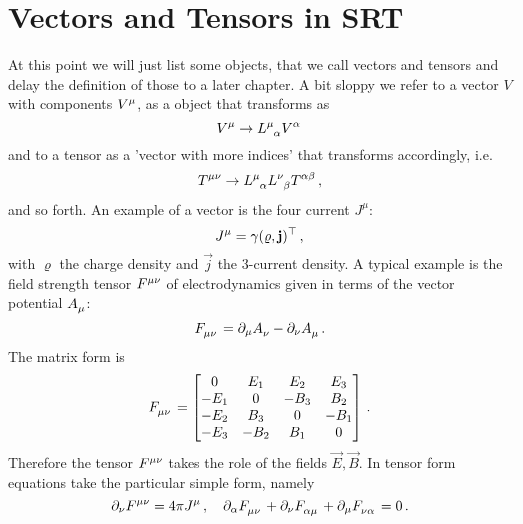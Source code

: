 \section{Vectors and Tensors in SRT}
At this point we will just list some objects, that we call vectors and tensors
and delay the definition of those to a later chapter.
A bit sloppy we refer to a vector $V$ with components $\tensor{V}{^\mu}$, as a
object that transforms as
\begin{equation}
    \tensor{V}{^\mu}\to
    \tensor{L}{^\mu_\alpha}\tensor{V}{^\alpha}\,
\end{equation}
and to a tensor as a 'vector with more indices' that
transforms accordingly, i.e.
\begin{equation}
    \tensor{T}{^\mu^\nu}\to
    \tensor{L}{^\mu_\alpha}\tensor{L}{^\nu_\beta}\tensor{T}{^\alpha^\beta}\,,
\end{equation}
and so forth.
An example of a vector is the four current $J^\mu$:
\begin{equation}
    J^\mu=\gamma(\varrho,\mathbf{j})^\top\, ,
\end{equation}
with $\varrho$ the charge density and $\vec{j}$ the 3-current density.
A typical example is the field strength tensor
$\tensor{F}{^\mu^\nu}$ of electrodynamics given in terms of the
vector potential $\tensor{A}{_\mu}$:
\begin{equation}
    \tensor{F}{_\mu_\nu}=\partial_\mu\tensor{A}{_\nu}-\partial_\nu\tensor{A}{_\mu}\,.
\end{equation}
The matrix form is
\begin{equation}
    \tensor{F}{_\mu_\nu}=
    \begin{bmatrix}
        0  &   E_1 &  E_2 &  E_3 \\
        -E_1 &   0  &  -B_3 & B_2 \\
        -E_2 & B_3 &   0  &  -B_1 \\
        -E_3 &  -B_2 & B_1 &   0  \\
    \end{bmatrix}\, .
\end{equation}
Therefore the tensor $\tensor{F}{^\mu^\nu}$ takes the role of the fields
$\vec{E},\vec{B}$. In tensor form  equations take the particular
simple form, namely
\begin{equation}
    \label{eq:maxwell_eqs}
    \partial_\nu\tensor{F}{^\mu^\nu}=4\pi\tensor{J}{^\mu}\,, \quad
    \partial_\alpha\tensor{F}{_\mu_\nu}
    +\partial_\nu\tensor{F}{_\alpha_\mu}
    +\partial_\mu\tensor{F}{_\nu_\alpha}=0\,.
\end{equation}
